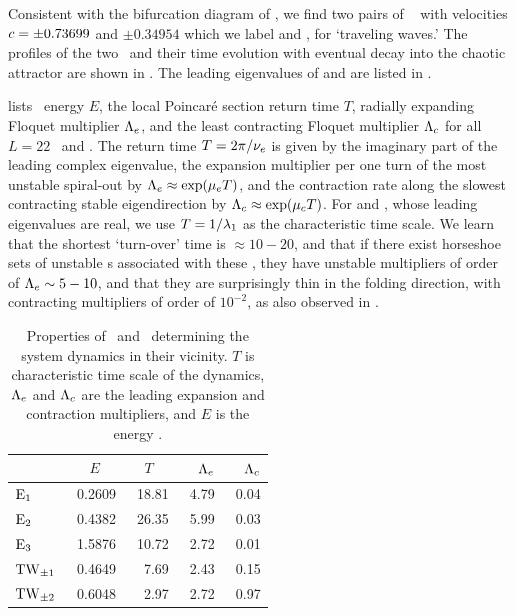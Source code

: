 Consistent with the bifurcation diagram of ,
we find two pairs of \reqva\  with velocities
$\velRel =\pm 0.73699$ and $\pm 0.34954$
which we label  and ,
for `traveling waves.'
The profiles of the two \reqva\ and their time evolution
with eventual decay into the chaotic attractor are
shown in .  The leading eigenvalues of
 and  are listed in .

 lists \eqv\ energy $E$,
the local Poincar\'e section return time $T$,
radially expanding Floquet multiplier $\ExpaEig_e$, and
the least contracting Floquet multiplier $\ExpaEig_c$
for all $L=22$ \eqva\ and \reqva.
The return time $T=2\pi/\eigIm[e]$ is given by the imaginary
part of the leading complex eigenvalue,
the expansion
multiplier per one turn of the most unstable spiral-out by
$\ExpaEig_e\approx\exp(\eigRe[e] T)$, and the contraction
rate along the slowest contracting stable eigendirection by
$\ExpaEig_c\approx\exp(\eigRe[c]T)$.
For  and , whose leading eigenvalues are
real, we use $T=1/\Lyap_1$ as the characteristic time scale.
We learn that the shortest
`turn-over' time is $\approx 10-20$, and that if there exist
horseshoe sets of unstable \po s associated with
these \eqva,  they have unstable
multipliers of order of $\ExpaEig_e \sim 5-10$, and that
they are surprisingly thin in the folding direction, with
contracting multipliers of order of $10^{-2}$,
as also observed in .

\begin{table}[ht]
    \caption{
    Properties of \eqva\ and \reqva\ determining
    the system dynamics in their vicinity.  $T$ is characteristic
    time scale of the dynamics, $\ExpaEig_e$ and $\ExpaEig_c$ are the
    leading expansion and contraction multipliers, and $E$ is the
    energy .
            }
\begin{center} \footnotesize
    \begin{tabular}{l|rrrr}
                 & $E$~~   & $T$~~  & $\ExpaEig_e$  & $\ExpaEig_c$  \\ \hline
 $\EQV{1}\ $     &\ 0.2609 &\ 18.81 &\ 4.79     &\ 0.04 \\
 $\EQV{2}\ $     &\ 0.4382 &\ 26.35 &\ 5.99     &\ 0.03 \\
 $\EQV{3}\ $     &\ 1.5876 &\ 10.72 &\ 2.72     &\ 0.01 \\ %
 $\REQV{\pm}{1}$ &\ 0.4649 &\  7.69 &\ 2.43     &\ 0.15 \\
 $\REQV{\pm}{2}$ &\ 0.6048 &\  2.97 &\ 2.72     &\ 0.97 \\ %
    \end{tabular}
\end{center}
\label{tab:L22cminus}
\end{table}

